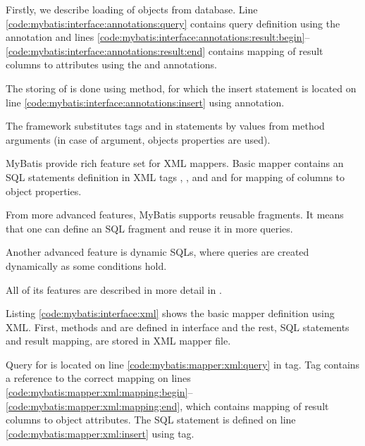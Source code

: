 Firstly, we describe loading of  objects from database.
Line \ref{code:mybatis:interface:annotations:query}
contains query definition using the  annotation and lines
\ref{code:mybatis:interface:annotations:result:begin}--\ref{code:mybatis:interface:annotations:result:end}
contains mapping of result columns to  attributes
using the  and  annotations.

The storing of  is done using  method,
for which the insert statement is located on line \ref{code:mybatis:interface:annotations:insert}
using  annotation.

The framework substitutes tags  and 
in statements by values from method arguments (in case of  argument,
objects properties are used).


MyBatis provide rich feature set for XML mappers. Basic mapper contains an SQL statements
definition in XML tags , ,  and 
and  for mapping of columns to object properties.

From more advanced features, MyBatis supports reusable fragments. It means that
one can define an SQL fragment and reuse it in more queries.

Another advanced feature is dynamic SQLs, where queries are created dynamically
as some conditions hold.

All of its features are described in more detail in \citet{MyBatis}.

Listing \ref{code:mybatis:interface:xml} shows the basic mapper definition using XML.
First, methods  and  are defined in  interface and the rest,
SQL statements and result mapping, are stored in XML mapper file.

Query for  is located on line \ref{code:mybatis:mapper:xml:query} in  tag.
Tag contains a reference to the correct  mapping on lines
\ref{code:mybatis:mapper:xml:mapping:begin}--\ref{code:mybatis:mapper:xml:mapping:end},
which contains mapping of result columns to  object attributes.
The  SQL statement is defined on line \ref{code:mybatis:mapper:xml:insert}
using  tag.




